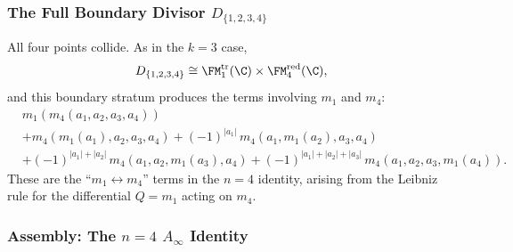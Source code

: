 \subsubsection{The Full Boundary Divisor $D_{\{1,2,3,4\}}$}

\begin{computation}[$D_{\{1,2,3,4\}}$]
All four points collide. As in the $k=3$ case,
\[
D_{\{1,2,3,4\}}
\cong
\FM_1^{\mathrm{tr}}(\C)\times\FM_4^{\mathrm{red}}(\C),
\]
and this boundary stratum produces the terms involving $m_1$ and $m_4$:
\begin{align*}
&m_1(m_4(a_1,a_2,a_3,a_4)) \\
&+ m_4(m_1(a_1),a_2,a_3,a_4) + (-1)^{|a_1|}\, m_4(a_1,m_1(a_2),a_3,a_4) \\
&+ (-1)^{|a_1|+|a_2|}\, m_4(a_1,a_2,m_1(a_3),a_4) + (-1)^{|a_1|+|a_2|+|a_3|}\, m_4(a_1,a_2,a_3,m_1(a_4)).
\end{align*}
These are the ``$m_1 \leftrightarrow m_4$'' terms in the $n=4$ identity, arising from the Leibniz rule for the differential $Q = m_1$ acting on $m_4$.
\end{computation}

\subsubsection{Assembly: The $n=4$ $A_\infty$ Identity}

